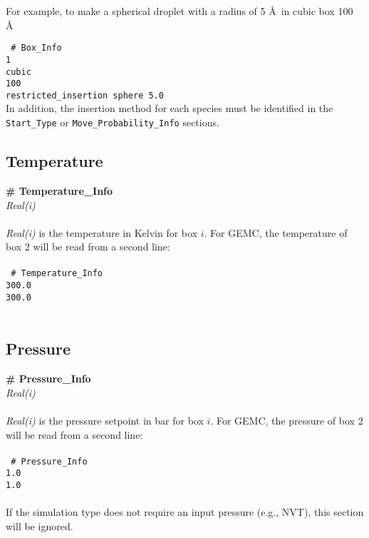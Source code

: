 For example, to make a spherical droplet with a radius of 5 \AA\ in cubic box 100 \AA\

\texttt{
\# Box\_Info \\
	1 \\
	cubic \\
	100 \\
	restricted\_insertion sphere 5.0} \\

In addition, the insertion method for each species must be identified in the
\texttt{Start\_Type} or \texttt{Move\_Probability\_Info} sections.

%
%
%
%
%
\subsection{Temperature}\label{sec:Temperature_Info}
{\bf \# Temperature\_Info} \\
{\it Real(i)} \\ \\
%
{\it Real(i)} is the temperature in Kelvin for box $i$.
For GEMC, the temperature of box 2 will be read from a second line: \\ \\
%
\texttt{
\# Temperature\_Info \\
 300.0 \\
 300.0} \\ \\
%
%
%
\subsection{Pressure}\label{sec:Pressure_Info}
{\bf \# Pressure\_Info} \\
{\it Real(i)} \\ \\
%
{\it Real(i)} is the pressure setpoint in bar for box $i$.
For GEMC, the pressure of box 2 will be read from a second line: \\ \\
%
\texttt{
\# Pressure\_Info \\
 1.0 \\
 1.0} \\ \\
%
If the simulation type does not require an input pressure (e.g., NVT), this section will be ignored.
%
%
